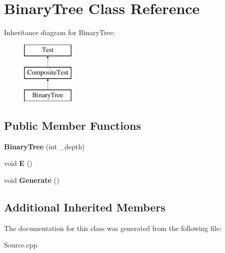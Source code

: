 \hypertarget{class_binary_tree}{}\section{Binary\+Tree Class Reference}
\label{class_binary_tree}
Inheritance diagram for Binary\+Tree\+:\begin{figure}[H]
\begin{center}
\leavevmode
\includegraphics[height=3.000000cm]{class_binary_tree}
\end{center}
\end{figure}
\subsection*{Public Member Functions}
\begin{DoxyCompactItemize}
\item 
\mbox{\label{class_binary_tree_a115788642169d3b9e8cccc8456a59091}} 
{\bfseries Binary\+Tree} (int \+\_\+depth)
\item 
\mbox{\label{class_binary_tree_a5797bee232ef3dc202c8fa6a54613806}} 
void {\bfseries E} ()
\item 
\mbox{\label{class_binary_tree_a3c3b9ca7202c16f17259740a4b4a359c}} 
void {\bfseries Generate} ()
\end{DoxyCompactItemize}
\subsection*{Additional Inherited Members}


The documentation for this class was generated from the following file\+:\begin{DoxyCompactItemize}
\item 
Source.\+cpp\end{DoxyCompactItemize}
